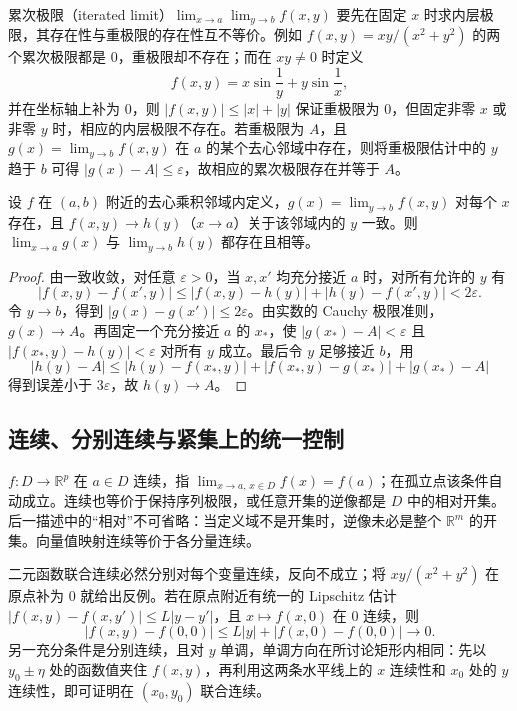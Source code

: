 累次极限（iterated limit）$\lim_{x\to a}\lim_{y\to b}f(x,y)$ 要先在固定 $x$ 时求内层极限，其存在性与重极限的存在性互不等价。例如 $f(x,y)=xy/(x^2+y^2)$ 的两个累次极限都是 $0$，重极限却不存在；而在 $xy\ne0$ 时定义
\[
f(x,y)=x\sin\frac1y+y\sin\frac1x,
\]
并在坐标轴上补为 $0$，则 $|f(x,y)|\le|x|+|y|$ 保证重极限为 $0$，但固定非零 $x$ 或非零 $y$ 时，相应的内层极限不存在。若重极限为 $A$，且 $g(x)=\lim_{y\to b}f(x,y)$ 在 $a$ 的某个去心邻域中存在，则将重极限估计中的 $y$ 趋于 $b$ 可得 $|g(x)-A|\le\varepsilon$，故相应的累次极限存在并等于 $A$。

\begin{theorem}
\label{thm:pei-interchange-limits}
设 $f$ 在 $(a,b)$ 附近的去心乘积邻域内定义，$g(x)=\lim_{y\to b}f(x,y)$ 对每个 $x$ 存在，且 $f(x,y)\to h(y)$（$x\to a$）关于该邻域内的 $y$ 一致。则 $\lim_{x\to a}g(x)$ 与 $\lim_{y\to b}h(y)$ 都存在且相等。
\end{theorem}
\begin{proof}
由一致收敛，对任意 $\varepsilon>0$，当 $x,x'$ 均充分接近 $a$ 时，对所有允许的 $y$ 有
\[
|f(x,y)-f(x',y)|\le|f(x,y)-h(y)|+|h(y)-f(x',y)|<2\varepsilon.
\]
令 $y\to b$，得到 $|g(x)-g(x')|\le2\varepsilon$。由实数的 Cauchy 极限准则，$g(x)\to A$。再固定一个充分接近 $a$ 的 $x_*$，使 $|g(x_*)-A|<\varepsilon$ 且 $|f(x_*,y)-h(y)|<\varepsilon$ 对所有 $y$ 成立。最后令 $y$ 足够接近 $b$，用
\[
|h(y)-A|\le|h(y)-f(x_*,y)|+|f(x_*,y)-g(x_*)|+|g(x_*)-A|
\]
得到误差小于 $3\varepsilon$，故 $h(y)\to A$。
\end{proof}

\subsection{连续、分别连续与紧集上的统一控制}

$f:D\to\mathbb R^p$ 在 $a\in D$ 连续，指 $\lim_{x\to a,\,x\in D}f(x)=f(a)$；在孤立点该条件自动成立。连续也等价于保持序列极限，或任意开集的逆像都是 $D$ 中的相对开集。后一描述中的“相对”不可省略：当定义域不是开集时，逆像未必是整个 $\mathbb R^m$ 的开集。向量值映射连续等价于各分量连续。

二元函数联合连续必然分别对每个变量连续，反向不成立；将 $xy/(x^2+y^2)$ 在原点补为 $0$ 就给出反例。若在原点附近有统一的 Lipschitz 估计 $|f(x,y)-f(x,y')|\le L|y-y'|$，且 $x\mapsto f(x,0)$ 在 $0$ 连续，则
\[
|f(x,y)-f(0,0)|\le L|y|+|f(x,0)-f(0,0)|\longrightarrow0.
\]
另一充分条件是分别连续，且对 $y$ 单调，单调方向在所讨论矩形内相同：先以 $y_0\pm\eta$ 处的函数值夹住 $f(x,y)$，再利用这两条水平线上的 $x$ 连续性和 $x_0$ 处的 $y$ 连续性，即可证明在 $(x_0,y_0)$ 联合连续。

